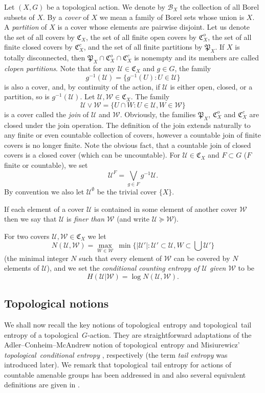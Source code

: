 \documentclass[12pt]{amsart}
\theoremstyle{definition}
\numberwithin{equation}{section}
\newcommand{\CU}{\mathcal{U}}
\newcommand{\CW}{\mathcal{W}}
\newcommand{\GC}{\mathfrak{C}}
\newcommand{\GP}{\mathfrak{P}}
\def \tl {topological}
\def \CU {\mathcal U}
\def \tl {topological}
\begin{document}
Let $(X, G)$ be a topological action. We denote by $\mathcal {B}_X$ the collection of all Borel subsets of $X$. By a {\it cover} of $X$ we mean a family of Borel sets
whose union is $X$. A {\it partition} of $X$ is a cover whose elements are pairwise disjoint. Let us denote the set of all covers by $\GC_X$, the set of all finite open covers by $\GC^o_X$, the set of all finite closed covers by $\GC^c_X$, and the set of all finite partitions by $\GP_X$. If $X$ is totally disconnected, then $\GP_X\cap\GC^o_X\cap\GC^c_X$ is nonempty and its members are called \emph{clopen partitions}. Note that for any $\mathcal U\in\GC_X$ and $g\in G$, the family 
$$
g^{-1}(\mathcal U)=\{g^{-1}(U):U\in\mathcal U\}
$$ 
is also a cover, and, by continuity of the action, if $\mathcal U$ is either open, closed, or a partition, so is $g^{-1}(\mathcal U)$. Let $\mathcal U,\CW\in \GC_X$. The family
$$
\mathcal U\vee \CW= \{U\cap W: U\in \mathcal U, W\in \CW\}
$$
is a cover called the \emph{join} of $\mathcal U$ and $\CW$. Obviously, the families $\GP_X$, $\GC^o_X$ and $\GC^c_X$ are closed under the join operation. The definition of the join extends naturally to any finite or even countable collection of covers, however a countable join of finite covers is no longer finite. Note the obvious fact, that a countable join of closed covers is a closed cover (which can be uncountable). 
For $\CU\in \GC_X$ and $F\subset G$ ($F$ finite or countable), we set
$$
\CU^F= \bigvee_{g\in F} g^{- 1} \CU.
$$
By convention we also let $\CU^\emptyset$ be the trivial cover $\{X\}$.

If each element of a cover $\mathcal U$ is contained in some element of another cover $\CW$ then we say that $\mathcal U$ is \emph{finer than $\CW$} (and write $\mathcal U\succeq \CW$). 

For two covers $\CU,\CW\in \GC_X$ we let 
$$
N(\CU,\CW) = \max_{W\in\CW}\ \min\{|\CU'|:\CU'\subset\CU, W\subset \bigcup\CU'\}
$$
(the minimal integer $N$ such that every element of $\CW$ can be covered by $N$ elements of $\CU$), and we set the \emph{conditional counting entropy of $\CU$ given $\CW$} to be
$$
H(\CU|\CW)=\log N(\CU,\CW).
$$

\subsection{Topological notions}
We shall now recall the key notions of \tl\ entropy and \tl\ tail entropy of a \tl\ $G$-action. They are straightforward adaptations of the Adler--Conheim--McAndrew notion of \tl\ entropy and Misiurewicz' \emph{\tl\ conditional entropy} \cite{Mi1}, respectively (the term \emph{tail entropy} was introduced later). We remark that \tl\ tail entropy for actions of countable amenable groups has been addressed in \cite{ChungZhang, ZhouZhangChen} and also several equivalent definitions are given in \cite{Zhou}.
\end{document}
